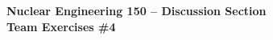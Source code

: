 \documentclass{report}
\begin{document}
\begin{center}
\textbf{\large Nuclear Engineering 150 -- Discussion Section}\\ 
\textbf{Team Exercises \#4}
\end{center}


\newpage


\newpage
\end{document}
